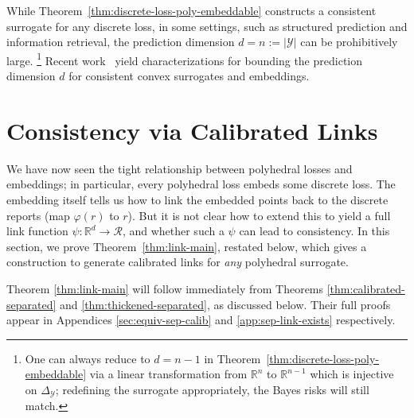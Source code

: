 \documentclass[11pt]{article}
\newcommand{\Comments}{1}
\newcommand{\mynote}[2]{\ifnum\Comments=1\textcolor{#1}{#2}\fi}
\newcommand{\mytodo}[2]{\ifnum\Comments=1%
  \todo[linecolor=#1!80!black,backgroundcolor=#1,bordercolor=#1!80!black]{#2}\fi}
\newcommand{\raft}[1]{\mytodo{green!20!white}{RF: #1}}
\newcommand{\jessie}[1]{\mynote{teal}{[JF: #1]}}
\newcommand{\reals}{\mathbb{R}}
\newcommand{\simplex}{\Delta_\Y}
\newcommand{\R}{\mathcal{R}}
\newcommand{\Y}{\mathcal{Y}}
\newtheorem{theorem}{Theorem}
\begin{document}
While Theorem~\ref{thm:discrete-loss-poly-embeddable} constructs a consistent surrogate for any discrete loss, in some settings, such as structured prediction and information retrieval, the prediction dimension $d = n := |\Y|$ can be prohibitively large.%
\footnote{One can always reduce to $d=n-1$ in Theorem~\ref{thm:discrete-loss-poly-embeddable} via a linear transformation from $\reals^n$ to $\reals^{n-1}$ which is injective on $\simplex$; redefining the surrogate appropriately, the Bayes risks will still match.}
Recent work~\citep{ramaswamy2016convex,finocchiaro2020embedding,finocchiaro2021unifying} yield characterizations for bounding the prediction dimension $d$ for consistent convex surrogates and embeddings.



\section{Consistency via Calibrated Links}
\label{sec:calibration}

We have now seen the tight relationship between polyhedral losses and embeddings; in particular, every polyhedral loss embeds some discrete loss.
The embedding itself tells us how to link the embedded points back to the discrete reports (map $\varphi(r)$ to $r$).
But it is not clear how to extend this to yield a full link function $\psi: \reals^d \to \R$, and whether such a $\psi$ can lead to consistency.
In this section, we prove Theorem~\ref{thm:link-main}, restated below, which gives a construction to generate calibrated links for \emph{any} polyhedral surrogate.

\linkinformal*

Theorem \ref{thm:link-main} will follow immediately from Theorems \ref{thm:calibrated-separated} and \ref{thm:thickened-separated}, as discussed below.
Their full proofs appear in Appendices \ref{sec:equiv-sep-calib} and \ref{app:sep-link-exists} respectively.
\end{document}
